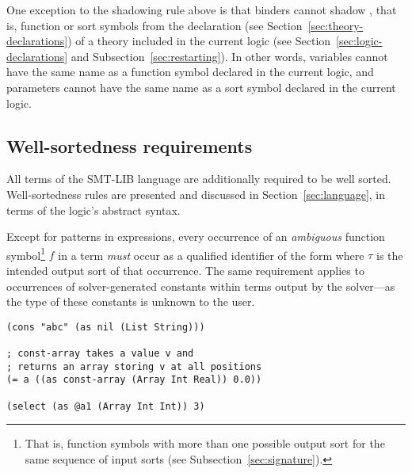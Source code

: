 \begin{remark}
One exception to the shadowing rule above is that binders cannot shadow ,
that is, function or sort symbols from the declaration 
(see Section~\ref{sec:theory-declarations})
of a theory included in the current logic
(see Section~\ref{sec:logic-declarations} and Subsection~\ref{sec:restarting}).
In other words, variables cannot have the same name 
as a function symbol declared in the current logic, and parameters
cannot have the same name as a sort symbol declared in the current logic.
\end{remark}

\subsection{Well-sortedness requirements} \label{well-sortedness}

All terms of the SMT-LIB language are additionally required to be well sorted.
Well-sortedness rules are presented and discussed in Section~\ref{sec:language},
in terms of the logic's abstract syntax.

Except for patterns in  expressions,
every occurrence of an \emph{ambiguous} function symbol\footnote{%
That is, function symbols with more than one possible output sort 
for the same sequence of input sorts (see Subsection~\ref{sec:signature}).
}
$f$ in a term \emph{must} occur as a qualified identifier of the form
 where $\tau$ is the intended output sort
of that occurrence.
The same requirement applies to occurrences of solver-generated constants
within terms output by the solver---as the type of these constants is unknown
to the user.

\begin{lstlisting}[linewidth=32em]
(cons "abc" (as nil (List String)))

; const-array takes a value v and
; returns an array storing v at all positions
(= a ((as const-array (Array Int Real)) 0.0))

(select (as @a1 (Array Int Int)) 3)
\end{lstlisting}


